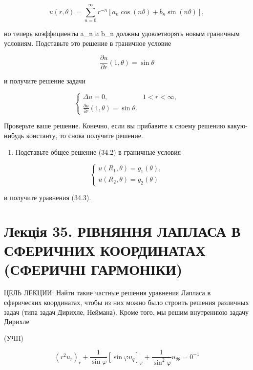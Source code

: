 \documentclass[
  ukrainian,
]{article}
\providecommand{\tightlist}{%
  \setlength{\itemsep}{0pt}\setlength{\parskip}{0pt}}
\begin{document}
\[
u(r, \theta) = \sum_{n=0}^{\infty} r^{-n} [a_n \cos(n\theta) + b_n \sin(n\theta)],
\]

но теперь коэффициенты a\_n и b\_n должны удовлетворять новым граничным
условиям. Подставьте это решение в граничное условие

\[
\frac{\partial u}{\partial r}(1, \theta) = \sin \theta
\]

и получите решение задачи

\[
\begin{cases} \Delta u = 0, & 1 < r < \infty, \\ \frac{\partial u}{\partial r}(1, \theta) = \sin \theta. \end{cases}
\]

Проверьте ваше решение. Конечно, если вы прибавите к своему решению
какую-нибудь константу, то снова получите решение.

\begin{enumerate}
\def\labelenumi{\arabic{enumi}.}
\setcounter{enumi}{3}
\tightlist
\item
  Подставьте общее решение (34.2) в граничные условия
\end{enumerate}

\[
\begin{cases} u(R_1, \theta) = g_1(\theta), \\ u(R_2, \theta) = g_2(\theta) \end{cases}
\]

и получите уравнения (34.3).

\section{Лекція 35. РІВНЯННЯ ЛАПЛАСА В СФЕРИЧНИХ КООРДИНАТАХ (СФЕРИЧНІ
ГАРМОНІКИ)}\label{ux43bux435ux43aux446ux456ux44f-35.-ux440ux456ux432ux43dux44fux43dux43dux44f-ux43bux430ux43fux43bux430ux441ux430-ux432-ux441ux444ux435ux440ux438ux447ux43dux438ux445-ux43aux43eux43eux440ux434ux438ux43dux430ux442ux430ux445-ux441ux444ux435ux440ux438ux447ux43dux456-ux433ux430ux440ux43cux43eux43dux456ux43aux438}

ЦЕЛЬ ЛЕКЦИИ: Найти такие частные решения уравнения Лапласа в сферических
координатах, чтобы из них можно было строить решения различных задач
(типа задач Дирихле, Неймана). Кроме того, мы решим внутреннюю задачу
Дирихле

(УЧП)

\[
(r^2u_r)_r + \frac{1}{\sin\varphi} \left[\sin\varphi u_q\right]_{\varphi} + \frac{1}{\sin^2\varphi} u_{\theta\theta} = 0^{-1}
\]
\end{document}
